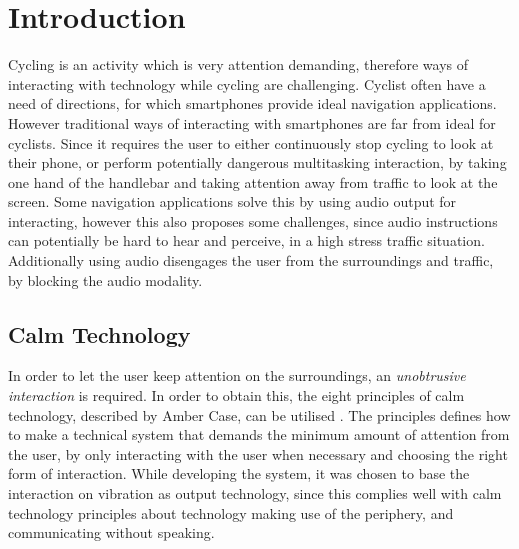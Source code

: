 \documentclass{sigchi}
\begin{document}


\section{Introduction}
Cycling is an activity which is very attention demanding, therefore ways of interacting with technology while cycling are challenging. Cyclist often have a need of directions, for which smartphones provide ideal navigation applications. However traditional ways of interacting with smartphones are far from ideal for cyclists. Since it requires the user to either continuously stop cycling to look at their phone, or perform potentially dangerous multitasking interaction, by taking one hand of the handlebar and taking attention away from traffic to look at the screen. 
\newline
\newline
Some navigation applications solve this by using audio output for interacting, however this also proposes some challenges, since audio instructions can potentially be hard to hear and perceive, in a high stress traffic situation. Additionally using audio disengages the user from the surroundings and traffic, by blocking the audio modality.
\subsection{Calm Technology}
In order to let the user keep attention on the surroundings, an \textit{unobtrusive interaction} is required. In order to obtain this, the eight principles of calm technology, described by Amber Case, can be utilised \cite{case15}. The principles  defines how to make a technical system that demands the minimum amount of attention from the user, by only interacting with the user when necessary and choosing the right form of  interaction.  
\newline
\newline 
While developing the system, it was chosen to base the interaction on vibration as output technology, since this complies well with calm technology principles about technology making use of the periphery, and communicating without speaking.
\end{document}
